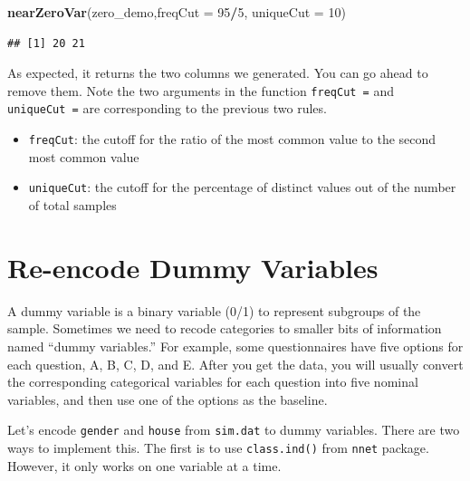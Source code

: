 \documentclass[12pt,]{krantz}
\makeatletter
\newenvironment{Shaded}{\begin{snugshade}}{\end{snugshade}}
\newcommand{\DataTypeTok}[1]{\textcolor[rgb]{0.27,0.27,0.27}{#1}}
\newcommand{\DecValTok}[1]{\textcolor[rgb]{0.06,0.06,0.06}{#1}}
\newcommand{\KeywordTok}[1]{\textcolor[rgb]{0.27,0.27,0.27}{\textbf{#1}}}
\newcommand{\NormalTok}[1]{#1}
\newcommand{\OperatorTok}[1]{\textcolor[rgb]{0.43,0.43,0.43}{\textbf{#1}}}
\newcommand{\StringTok}[1]{\textcolor[rgb]{0.5,0.5,0.5}{#1}}
\providecommand{\tightlist}{%
  \setlength{\itemsep}{0pt}\setlength{\parskip}{0pt}}
\newenvironment{kframe}{%
\medskip{}
\setlength{\fboxsep}{.8em}
 \def\at@end@of@kframe{}%
 \ifinner\ifhmode%
  \def\at@end@of@kframe{\end{minipage}}%
  \begin{minipage}{\columnwidth}%
 \fi\fi%
 \def\FrameCommand##1{\hskip\@totalleftmargin \hskip-\fboxsep
 \colorbox{shadecolor}{##1}\hskip-\fboxsep
     \hskip-\linewidth \hskip-\@totalleftmargin \hskip\columnwidth}%
 \MakeFramed {\advance\hsize-\width
   \@totalleftmargin\z@ \linewidth\hsize
   \@setminipage}}%
 {\par\unskip\endMakeFramed%
 \at@end@of@kframe}
\renewenvironment{Shaded}{\begin{kframe}}{\end{kframe}}
\makeatother
\begin{document}
\begin{Shaded}
\begin{Highlighting}[]
\KeywordTok{nearZeroVar}\NormalTok{(zero_demo,}\DataTypeTok{freqCut =} \DecValTok{95}\OperatorTok{/}\DecValTok{5}\NormalTok{, }\DataTypeTok{uniqueCut =} \DecValTok{10}\NormalTok{)}
\end{Highlighting}
\end{Shaded}

\begin{verbatim}
## [1] 20 21
\end{verbatim}

As expected, it returns the two columns we generated. You can go ahead to remove them. Note the two arguments in the function \texttt{freqCut\ =} and \texttt{uniqueCut\ =} are corresponding to the previous two rules.

\begin{itemize}
\tightlist
\item
  \texttt{freqCut}: the cutoff for the ratio of the most common value to the second most common value
\item
  \texttt{uniqueCut}: the cutoff for the percentage of distinct values out of the number of total samples
\end{itemize}

\hypertarget{re-encode-dummy-variables}{%
\section{Re-encode Dummy Variables}\label{re-encode-dummy-variables}}

A dummy variable is a binary variable (0/1) to represent subgroups of the sample. Sometimes we need to recode categories to smaller bits of information named ``dummy variables.'' For example, some questionnaires have five options for each question, A, B, C, D, and E. After you get the data, you will usually convert the corresponding categorical variables for each question into five nominal variables, and then use one of the options as the baseline.

Let's encode \texttt{gender} and \texttt{house} from \texttt{sim.dat} to dummy variables. There are two ways to implement this. The first is to use \texttt{class.ind()} from \texttt{nnet} package. However, it only works on one variable at a time.

\begin{Shaded}
\end{Shaded}
\end{document}
